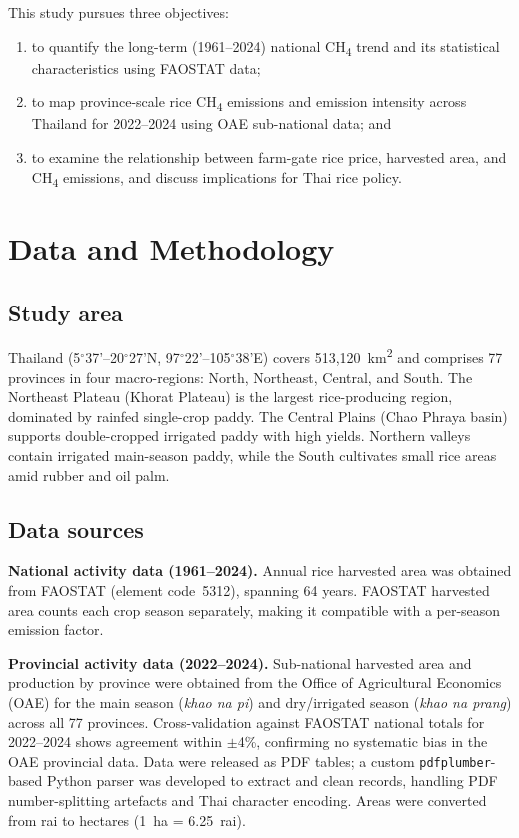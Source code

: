 \documentclass[fleqn,10pt]{olplainarticle}
\begin{document}
This study pursues three objectives:
\begin{enumerate}[noitemsep]
  \item to quantify the long-term (1961--2024) national CH\textsubscript{4} trend
        and its statistical characteristics using FAOSTAT data;
  \item to map province-scale rice CH\textsubscript{4} emissions and emission
        intensity across Thailand for 2022--2024 using OAE sub-national data; and
  \item to examine the relationship between farm-gate rice price, harvested area,
        and CH\textsubscript{4} emissions, and discuss implications for Thai rice policy.
\end{enumerate}

\section*{Data and Methodology}

\subsection*{Study area}

Thailand (5$^\circ$37'--20$^\circ$27'N, 97$^\circ$22'--105$^\circ$38'E) covers 513,120~km\textsuperscript{2}
and comprises 77 provinces in four macro-regions: North, Northeast, Central, and South.
The Northeast Plateau (Khorat Plateau) is the largest rice-producing region,
dominated by rainfed single-crop paddy.
The Central Plains (Chao Phraya basin) supports double-cropped irrigated paddy
with high yields.
Northern valleys contain irrigated main-season paddy, while the South cultivates
small rice areas amid rubber and oil palm.

\subsection*{Data sources}

\textbf{National activity data (1961--2024).}
Annual rice harvested area was obtained from FAOSTAT \citep{faostat2026}
(element code~5312), spanning 64 years.
FAOSTAT harvested area counts each crop season separately, making it compatible
with a per-season emission factor.

\textbf{Provincial activity data (2022--2024).}
Sub-national harvested area and production by province were obtained from the
Office of Agricultural Economics (OAE) \citep{oae2024} for the main season
(\textit{khao na pi}) and dry/irrigated season
(\textit{khao na prang}) across all 77 provinces.
Cross-validation against FAOSTAT national totals for 2022--2024 shows agreement
within $\pm$4\%, confirming no systematic bias in the OAE provincial data.
Data were released as PDF tables; a custom \texttt{pdfplumber}-based Python
parser was developed to extract and clean records, handling PDF number-splitting
artefacts and Thai character encoding.
Areas were converted from rai to hectares (1~ha = 6.25~rai).
\end{document}
